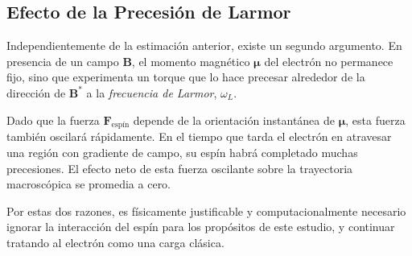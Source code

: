 \subsection{Efecto de la Precesión de Larmor}

Independientemente de la estimación anterior, existe un segundo argumento.
En presencia de un campo $\boldsymbol{B}$, el momento magnético
$\boldsymbol{\mu}$ del electrón no permanece fijo, sino que experimenta un
torque que lo hace precesar alrededor de la dirección de $\boldsymbol{B}^*$
a la \emph{frecuencia de Larmor}, $\omega_L$.

Dado que la fuerza $\boldsymbol{F}_{\text{espín}}$ depende de la orientación
instantánea de $\boldsymbol{\mu}$, esta fuerza también oscilará rápidamente.
En el tiempo que tarda el electrón en atravesar una región con gradiente de
campo, su espín habrá completado muchas precesiones. El efecto neto de esta
fuerza oscilante sobre la trayectoria macroscópica se promedia a cero.

Por estas dos razones, es físicamente justificable y computacionalmente
necesario ignorar la interacción del espín para los propósitos de este
estudio, y continuar tratando al electrón como una carga clásica.
